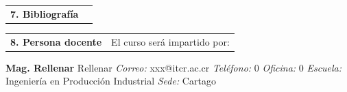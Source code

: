 \documentclass[letterpaper]{article}%
\newenvironment{textoMargen}
    {%
    \begin{list}{}{%
        \setlength{\leftmargin}{3.6cm}%
        \setlength{\rightmargin}{1.1cm}%
    }%
    \item[]%
  }
  {%
    \end{list}%
  }
\begin{document}
\vspace*{4mm}%
\newline%
\begin{tabularx}{\textwidth}{p{3cm}p{13cm}}%
\par\fontsize{12}{14}\selectfont \textbf{\textcolor{parte}{7. Bibliografía}}&\nocite{montgomery2020applied} \\%
\end{tabularx}%
\vspace*{-8mm}\printbibliography[heading=none]%
\begin{tabularx}{\textwidth}{p{3cm}p{13cm}}%
\par\fontsize{12}{14}\selectfont \textbf{\textcolor{parte}{8. Persona docente}}&El curso será impartido por:\\%
\end{tabularx}%
\vspace*{-4mm}\begin{textoMargen}\textbf{Mag. Rellenar} \newline Rellenar \newline \newline \emph{Correo:} xxx@itcr.ac.cr\emph{  Teléfono:} 0 \vspace*{1mm} \newline \emph{  Oficina:} 0\emph{  Escuela:} Ingeniería en Producción Industrial\emph{  Sede:} Cartago \vspace*{4mm} \newline \end{textoMargen}%
\end{document}
